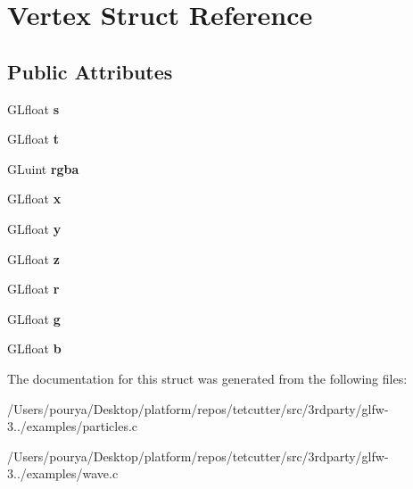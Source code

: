 \hypertarget{structVertex}{}\section{Vertex Struct Reference}
\label{structVertex}
\subsection*{Public Attributes}
\begin{DoxyCompactItemize}
\item 
\hypertarget{structVertex_aea3e9a4abc2d66854fb04fa87f5ffc65}{}G\+Lfloat {\bfseries s}\label{structVertex_aea3e9a4abc2d66854fb04fa87f5ffc65}

\item 
\hypertarget{structVertex_a9dad62ee3675ff8ea68aa25cfa0eef03}{}G\+Lfloat {\bfseries t}\label{structVertex_a9dad62ee3675ff8ea68aa25cfa0eef03}

\item 
\hypertarget{structVertex_ab591451dd15d1dab81af042a35f7e8b4}{}G\+Luint {\bfseries rgba}\label{structVertex_ab591451dd15d1dab81af042a35f7e8b4}

\item 
\hypertarget{structVertex_ae02cfb84a3e8f33a2a94a8d3b3798aac}{}G\+Lfloat {\bfseries x}\label{structVertex_ae02cfb84a3e8f33a2a94a8d3b3798aac}

\item 
\hypertarget{structVertex_a53f2719389e21b4e931282336d3817aa}{}G\+Lfloat {\bfseries y}\label{structVertex_a53f2719389e21b4e931282336d3817aa}

\item 
\hypertarget{structVertex_acda9f16691b233ed0d8db0f12079f7e9}{}G\+Lfloat {\bfseries z}\label{structVertex_acda9f16691b233ed0d8db0f12079f7e9}

\item 
\hypertarget{structVertex_a0874a00d75d70c7b1e0b57a85297ee3b}{}G\+Lfloat {\bfseries r}\label{structVertex_a0874a00d75d70c7b1e0b57a85297ee3b}

\item 
\hypertarget{structVertex_aaf212b0ecbcbf9c0367ddae30461fd03}{}G\+Lfloat {\bfseries g}\label{structVertex_aaf212b0ecbcbf9c0367ddae30461fd03}

\item 
\hypertarget{structVertex_a0a5270835c4e3bcce9bfc9ba4a069bbb}{}G\+Lfloat {\bfseries b}\label{structVertex_a0a5270835c4e3bcce9bfc9ba4a069bbb}

\end{DoxyCompactItemize}


The documentation for this struct was generated from the following files\+:\begin{DoxyCompactItemize}
\item 
/\+Users/pourya/\+Desktop/platform/repos/tetcutter/src/3rdparty/glfw-\/3../examples/particles.\+c\item 
/\+Users/pourya/\+Desktop/platform/repos/tetcutter/src/3rdparty/glfw-\/3../examples/wave.\+c\end{DoxyCompactItemize}
